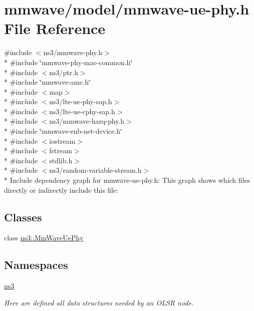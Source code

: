 \hypertarget{mmwave-ue-phy_8h}{}\section{mmwave/model/mmwave-\/ue-\/phy.h File Reference}
\label{mmwave-ue-phy_8h}
{\ttfamily \#include $<$ns3/mmwave-\/phy.\+h$>$}\\*
{\ttfamily \#include \char`\"{}mmwave-\/phy-\/mac-\/common.\+h\char`\"{}}\\*
{\ttfamily \#include $<$ns3/ptr.\+h$>$}\\*
{\ttfamily \#include \char`\"{}mmwave-\/amc.\+h\char`\"{}}\\*
{\ttfamily \#include $<$map$>$}\\*
{\ttfamily \#include $<$ns3/lte-\/ue-\/phy-\/sap.\+h$>$}\\*
{\ttfamily \#include $<$ns3/lte-\/ue-\/cphy-\/sap.\+h$>$}\\*
{\ttfamily \#include $<$ns3/mmwave-\/harq-\/phy.\+h$>$}\\*
{\ttfamily \#include \char`\"{}mmwave-\/enb-\/net-\/device.\+h\char`\"{}}\\*
{\ttfamily \#include $<$iostream$>$}\\*
{\ttfamily \#include $<$fstream$>$}\\*
{\ttfamily \#include $<$stdlib.\+h$>$}\\*
{\ttfamily \#include $<$ns3/random-\/variable-\/stream.\+h$>$}\\*
Include dependency graph for mmwave-\/ue-\/phy.h\+:
This graph shows which files directly or indirectly include this file\+:
\subsection*{Classes}
\begin{DoxyCompactItemize}
\item 
class \hyperlink{classns3_1_1MmWaveUePhy}{ns3\+::\+Mm\+Wave\+Ue\+Phy}
\end{DoxyCompactItemize}
\subsection*{Namespaces}
\begin{DoxyCompactItemize}
\item 
 \hyperlink{namespacens3}{ns3}
\begin{DoxyCompactList}\small\item\em Here are defined all data structures needed by an O\+L\+SR node. \end{DoxyCompactList}\end{DoxyCompactItemize}
